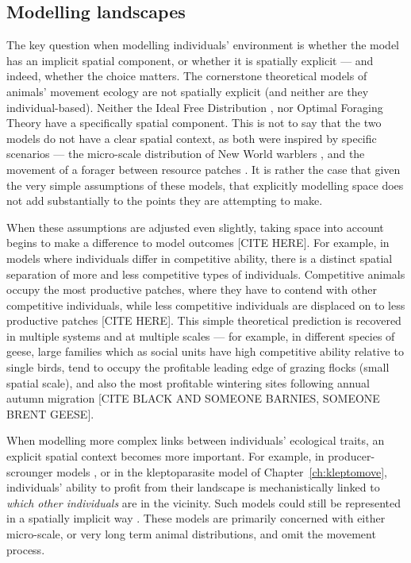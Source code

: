 \subsection*{Modelling landscapes}

The key question when modelling individuals' environment is whether the model has an implicit spatial component, or whether it is spatially explicit --- and indeed, whether the choice matters.
The cornerstone theoretical models of animals' movement ecology are not spatially explicit (and neither are they individual-based).
Neither the Ideal Free Distribution \citep{fretwell1970}, nor Optimal Foraging Theory \citep{charnov1976} have a specifically spatial component.
This is not to say that the two models do not have a clear spatial context, as both were inspired by specific scenarios --- the micro-scale distribution of New World warblers \citep[IFD:][]{fretwell1970}, and the movement of a forager between resource patches \citep{charnov1976}.
It is rather the case that given the very simple assumptions of these models, that explicitly modelling space does not add substantially to the points they are attempting to make.

When these assumptions are adjusted even slightly, taking space into account begins to make a difference to model outcomes [CITE HERE].
For example, in models where individuals differ in competitive ability, there is a distinct spatial separation of more and less competitive types of individuals.
Competitive animals occupy the most productive patches, where they have to contend with other competitive individuals, while less competitive individuals are displaced on to less productive patches [CITE HERE].
This simple theoretical prediction is recovered in multiple systems and at multiple scales --- for example, in different species of geese, large families which as social units have high competitive ability relative to single birds, tend to occupy the profitable leading edge of grazing flocks (small spatial scale), and also the most profitable wintering sites following annual autumn migration [CITE BLACK AND SOMEONE BARNIES, SOMEONE BRENT GEESE].

When modelling more complex links between individuals' ecological traits, an explicit spatial context becomes more important.
For example, in producer-scrounger models \citep[e.g.][]{beauchamp2008}, or in the kleptoparasite model of Chapter~\ref{ch:kleptomove}, individuals' ability to profit from their landscape is mechanistically linked to \emph{which other individuals} are in the vicinity.
Such models could still be represented in a spatially implicit way \citep{cressman2006,krivan2008,garay2015,garay2020}.
These models are primarily concerned with either micro-scale, or very long term animal distributions, and omit the movement process.

